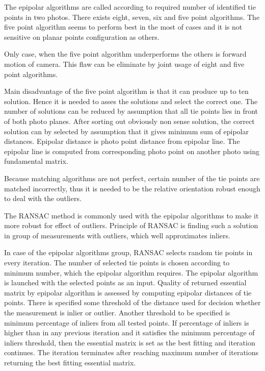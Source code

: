 \documentclass[a4paper,12pt]{article}
\begin{document}



The epipolar algorithms are  called 
according to required number of identified tie points in two photos.
There exists eight, seven, six and five point algorithms. The five point algorithm seems to perform best in the most
of cases \cite{stewenius2006recent} and it is not sensitive on planar points configuration as others.

Only case, when the five point algorithm \cite{nister2004efficient} underperforms 
\cite{bruckner2008experimental} the others is forward motion of camera.
This flaw can be eliminate by  joint usage of eight and five point algorithms.

Main disadvantage of the five point algorithm is that it can produce up to ten solution.
Hence it is needed to asses the solutions and select the correct one. The number of solutions
can be reduced by assumption that all tie points lies in front of both photo 
planes. After sorting out obviously non sense solution,
 the correct solution can by selected by assumption that it gives minimum sum of epipolar distances.
 Epipolar distance is photo point distance
 from epipolar line. The epipolar line is computed from corresponding photo point 
 on another photo using fundamental matrix.
  
Because matching algorithms are not perfect, certain number of the tie points are matched 
incorrectly, thus it is needed to be the relative orientation robust enough to
deal with the outliers.

The RANSAC \cite{wiki:RANSAC} method is commonly used with the epipolar algorithms to 
make it more robust for effect of outliers.
Principle of RANSAC is finding such  a solution in group of measurements with outliers, 
which well approximates inliers.  

In case of the epipolar algorithms group, RANSAC selects random tie points in every iteration.
The number of selected tie points is chosen according to minimum number, which the epipolar algorithm requires.
The epipolar algorithm is launched with the selected points as an input. 
Quality of returned essential matrix by epipolar algorithm is assessed by 
computing epipolar distances of tie points. There is specified some threshold of the distance used 
for decision whether the measurement is inlier or outlier. Another threshold to be specified 
is minimum percentage of inliers from all tested points. If percentage of inliers is higher than in any previous iteration
and it satisfies the minimum percentage of inliers threshold, then
the essential matrix is set as the best fitting and iteration continues. The iteration terminates after 
reaching maximum number of iterations returning the best fitting essential matrix.
\end{document}

